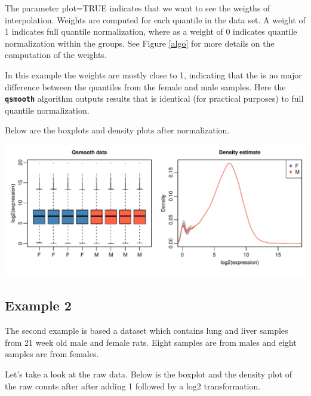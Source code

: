 \documentclass{article}\usepackage[]{graphicx}\usepackage[usenames,dvipsnames]{color}
\makeatletter
\def\maxwidth{ %
  \ifdim\Gin@nat@width>\linewidth
    \linewidth
  \else
    \Gin@nat@width
  \fi
}
\newenvironment{knitrout}{}{} %
\makeatother
\begin{document}
The parameter plot=TRUE indicates that we want to see the 
weigths of interpolation.
Weights are computed for each quantile in the data set.
A weight of 1 indicates full quantile normalization,
where as a weight of 0 indicates quantile normalization
within the groups. See Figure \ref{algo} for more details on
the computation of the weights.

In this example the weights are mostly close to 1,
indicating that the is no major difference between the 
quantiles from the female and male samples.
Here the \texttt{\bf{qsmooth}} algorithm outputs results
that is identical (for practical purposes)
to full quantile normalization. 

Below are the boxplots and density plots after normalization.
\begin{knitrout}
\color{fgcolor}

{\centering \includegraphics[width=\maxwidth]{figure/norm_data1-1} 

}



\end{knitrout}

\subsection{Example 2}

The second example is based a dataset
which contains lung and liver samples from 21 week old male and female rats. 
Eight samples are from males and eight samples are from females.



Let's take a look at the raw data. 
Below is the boxplot and the density plot
of the raw counts after after adding 1 followed by a 
log2 transformation.
\end{document}
